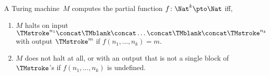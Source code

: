 \documentclass[../../../include/open-logic-section]{subfiles}
\begin{document}
\begin{defn}
  A Turing machine~$M$ computes the partial function $f\colon \Nat^k
  \pto \Nat$ iff, 
  \begin{enumerate}
    \item $M$ halts on input $\TMstroke^{n_1}\concat\TMblank\concat
    \dots \concat\TMblank\concat\TMstroke^{n_k}$ with output $\TMstroke^{m}$ if $f(n_1, \dots, n_k) = m$.
    \item $M$ does not halt at all, or with an output that is not a
    single block of~$\TMstroke$'s if $f(n_1, \dots, n_k)$ is undefined.
  \end{enumerate}
\end{defn}
\end{document}
